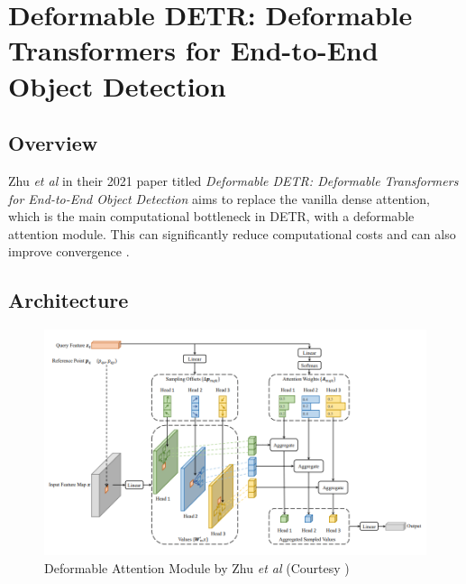 \section{Deformable DETR: Deformable Transformers for End-to-End Object Detection}

\label{appendix:deformable-detr-paper}

\subsection{Overview}

\par Zhu \textit{et al} in their 2021 paper titled \textit{Deformable DETR: Deformable Transformers for End-to-End Object Detection} aims to replace the vanilla dense attention, which is the main computational bottleneck in DETR, with a deformable attention module. This can significantly reduce computational costs and can also improve convergence \cite{zhu2020deformable}.
\par

\subsection{Architecture}
\begin{figure}[h]
	\centering
	\includegraphics[width=\linewidth]{assets/img/deformable-attention-module.png}
	\caption{Deformable Attention Module by Zhu
		\textit{et al} (Courtesy \cite{zhu2020deformable})}
\end{figure}

